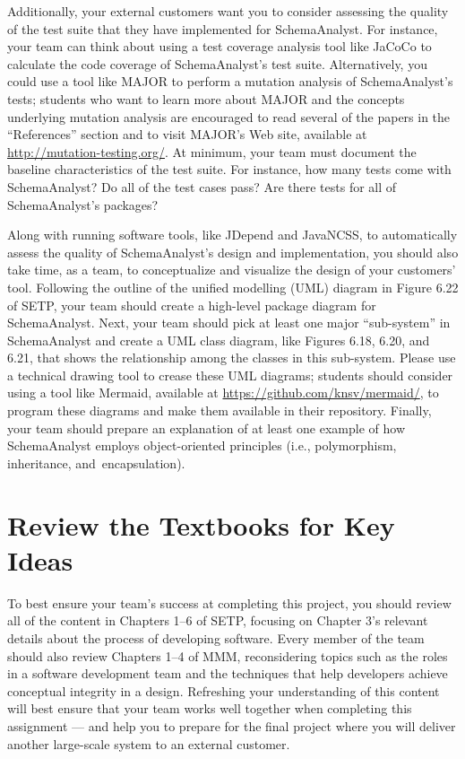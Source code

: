 Additionally, your external customers want you to consider assessing the quality of the test suite that they have
implemented for SchemaAnalyst. For instance, your team can think about using a test coverage analysis tool like JaCoCo
to calculate the code coverage of SchemaAnalyst's test suite. Alternatively, you could use a tool like MAJOR to perform
a mutation analysis of SchemaAnalyst's tests; students who want to learn more about MAJOR and the concepts underlying
mutation analysis are encouraged to read several of the papers in the ``References'' section and to visit MAJOR's Web
site, available at \url{http://mutation-testing.org/}. At minimum, your team must document the baseline characteristics
of the test suite. For instance, how many tests come with SchemaAnalyst? Do all of the test cases pass?  Are there tests
for all of SchemaAnalyst's packages?

Along with running software tools, like JDepend and JavaNCSS, to automatically assess the quality of SchemaAnalyst's
design and implementation, you should also take time, as a team, to conceptualize and visualize the design of your
customers' tool. Following the outline of the unified modelling (UML) diagram in Figure 6.22 of SETP, your team should
create a high-level package diagram for SchemaAnalyst. Next, your team should pick at least one major ``sub-system'' in
SchemaAnalyst and create a UML class diagram, like Figures 6.18, 6.20, and 6.21, that shows the relationship among the
classes in this sub-system. Please use a technical drawing tool to crease these UML diagrams; students should consider
using a tool like Mermaid, available at \url{https://github.com/knsv/mermaid/}, to program these diagrams and make them
available in their repository. Finally, your team should prepare an explanation of at least one example of how
SchemaAnalyst employs object-oriented principles (i.e., polymorphism, inheritance, \mbox{and encapsulation)}.

\section*{Review the Textbooks for Key Ideas}

To best ensure your team's success at completing this project, you should review all of the content in Chapters 1--6 of
SETP, focusing on Chapter 3's relevant details about the process of developing software. Every member of the team should
also review Chapters 1--4 of MMM, reconsidering topics such as the roles in a software development team and the
techniques that help developers achieve conceptual integrity in a design. Refreshing your understanding of this content
will best ensure that your team works well together when completing this assignment --- and help you to prepare for the
final project where you will deliver another large-scale system to an external customer.

